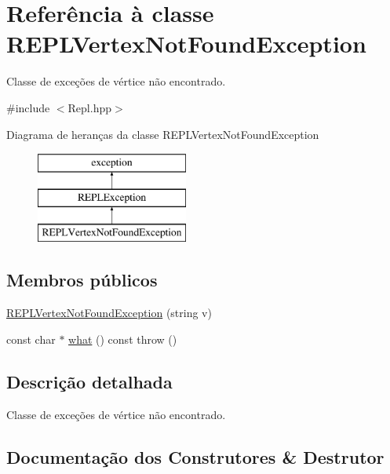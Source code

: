 \hypertarget{classREPLVertexNotFoundException}{}\section{Referência à classe R\+E\+P\+L\+Vertex\+Not\+Found\+Exception}
\label{classREPLVertexNotFoundException}


Classe de exceções de vértice não encontrado.  




{\ttfamily \#include $<$Repl.\+hpp$>$}

Diagrama de heranças da classe R\+E\+P\+L\+Vertex\+Not\+Found\+Exception\begin{figure}[H]
\begin{center}
\leavevmode
\includegraphics[height=3.000000cm]{classREPLVertexNotFoundException}
\end{center}
\end{figure}
\subsection*{Membros públicos}
\begin{DoxyCompactItemize}
\item 
\mbox{\hyperlink{classREPLVertexNotFoundException_a30fcae3c8ffc5c861cab7474bbf5f658}{R\+E\+P\+L\+Vertex\+Not\+Found\+Exception}} (string v)
\item 
const char $\ast$ \mbox{\hyperlink{classREPLVertexNotFoundException_ab8d189e6c0fcf90c87b4209096c45b53}{what}} () const  throw ()
\end{DoxyCompactItemize}


\subsection{Descrição detalhada}
Classe de exceções de vértice não encontrado. 

\subsection{Documentação dos Construtores \& Destrutor}
\mbox{\label{classREPLVertexNotFoundException_a30fcae3c8ffc5c861cab7474bbf5f658}} 
